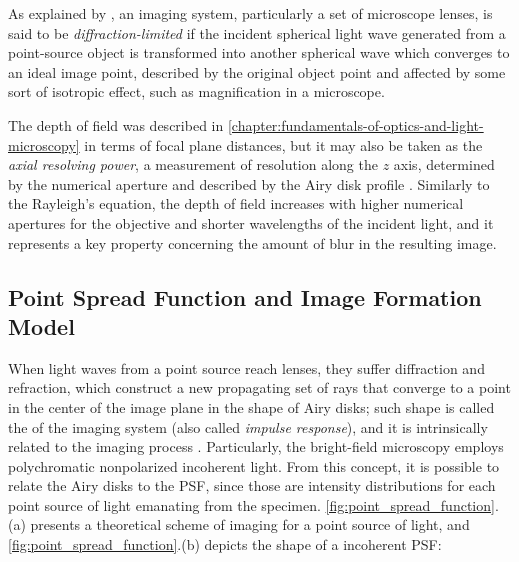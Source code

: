 As explained by , an imaging system, particularly a set of microscope lenses, is said to be \emph{diffraction-limited} if the incident spherical light wave generated from a point-source object is transformed into another spherical wave which converges to an ideal image point, described by the original object point and affected by some sort of isotropic effect, such as magnification in a microscope.

The depth of field was described in \autoref{chapter:fundamentals-of-optics-and-light-microscopy} in terms of focal plane distances, but it may also be taken as the \emph{axial resolving power}, a measurement of resolution along the $z$ axis, determined by the numerical aperture and described by the Airy disk profile \cite{davidson2002optical}. Similarly to the Rayleigh's equation, the depth of field increases
with higher numerical apertures for the objective and shorter wavelengths of the incident light, and it represents a key property concerning the amount of blur in the resulting image.


\subsection{Point Spread Function and Image Formation Model}

\label{sec:point_spread_function_and_image_formation_model}

When light waves from a point source reach lenses, they suffer diffraction and refraction, which construct a new propagating set of rays that converge to a point in the center of the image plane in the shape of Airy disks; such shape is called the 
of the imaging system (also called \emph{impulse response}), and it is intrinsically related to the imaging process \cite{wu2008microscope}. Particularly, the bright-field microscopy employs polychromatic nonpolarized incoherent light. From this concept, it is possible to relate the Airy disks to the PSF, since those are intensity distributions for each point source of light emanating from the specimen. \autoref{fig:point_spread_function}.(a) presents a theoretical scheme of imaging for a point source of light, and \autoref{fig:point_spread_function}.(b) depicts the shape of a incoherent PSF:


